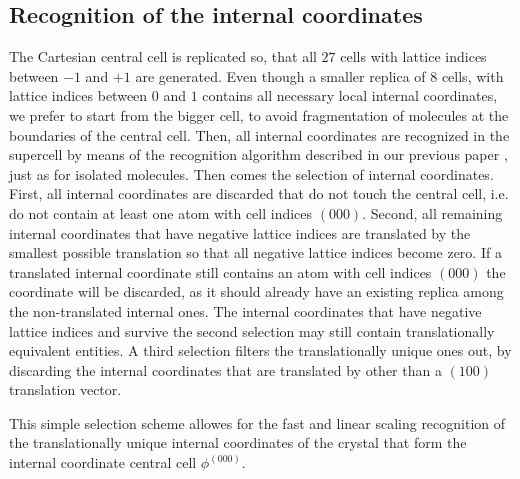 \documentclass[prl,aps,preprint,superbib,12pt]{revtex4}
\begin{document}
\subsection{Recognition of the internal coordinates}
The Cartesian central cell is replicated so, that all $27$ 
cells with lattice indices between $-1$ and $+1$ are generated.
Even though a smaller replica of 8 cells, with lattice indices
between $0$ and $1$ contains all necessary local internal coordinates,
we prefer to start from the bigger cell, to avoid fragmentation
of molecules at the boundaries of the central cell.
Then, all internal coordinates are recognized in the supercell
by means of the recognition algorithm described in our previous paper
\cite{KNemeth04}, just as for isolated molecules.
Then comes the selection of internal coordinates.
First, all internal coordinates are discarded that do not touch 
the central cell, i.e. do not contain at least one atom with
cell indices $(000)$.
Second, all remaining internal coordinates that have 
negative lattice indices
are translated by the smallest possible translation so that all 
negative lattice indices become zero. If a translated 
internal coordinate
still contains an atom with cell indices $(000)$
the coordinate will be discarded, as it should already have an existing
replica among the non-translated internal ones.
The internal coordinates that have negative
lattice indices and survive the second selection may still
contain translationally equivalent entities. A third selection
filters the translationally unique ones out, by discarding
the internal coordinates that are translated 
by other than a $(100)$ translation vector.

This simple selection scheme allowes for the fast and linear scaling 
recognition of the translationally unique internal coordinates
of the crystal that form the internal coordinate central 
cell $\phi^{(000)}$.
\end{document}
